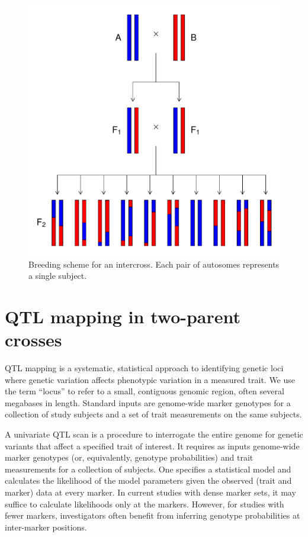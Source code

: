 \documentclass[oneside]{book}\usepackage[]{graphicx}\usepackage[]{color}
\makeatletter
\def\maxwidth{ %
  \ifdim\Gin@nat@width>\linewidth
    \linewidth
  \else
    \Gin@nat@width
  \fi
}
\newenvironment{knitrout}{}{} %
\makeatother
\begin{document}
\begin{knitrout}
\color{fgcolor}\begin{figure}
\includegraphics[width=\maxwidth]{figure/intercross-1} \caption[Breeding scheme for an intercross]{Breeding scheme for an intercross. Each pair of autosomes represents a single subject.}\label{fig:intercross}
\end{figure}


\end{knitrout}


\section{QTL mapping in two-parent crosses}

QTL mapping is a systematic, statistical approach to identifying genetic
loci where genetic variation affects phenotypic variation in a measured trait.
We use the term ``locus'' to refer to a small, contiguous genomic region, often
several megabases in length. Standard inputs are genome-wide marker genotypes for a collection of study subjects and a set of trait measurements on the same subjects.

A univariate QTL scan is a procedure to interrogate the entire genome for genetic
variants that affect a specified trait of interest.
It requires as inputs genome-wide marker genotypes (or, equivalently,
genotype probabilities) and trait measurements for a collection of subjects.
One specifies a statistical model and calculates the
likelihood of the model parameters given the observed (trait and marker) data at every marker. In current studies with dense marker sets, 
it may suffice to calculate likelihoods only at the markers. However, for
studies with fewer markers, investigators often benefit from inferring 
genotype probabilities at inter-marker positions.
\end{document}
